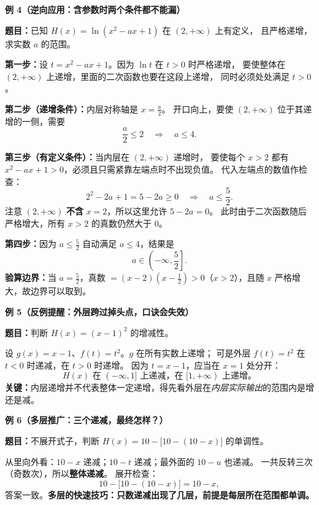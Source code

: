 \clearpage
\begin{examplebox}
\textbf{\textcolor{CExample}{例 4（逆向应用：含参数时两个条件都不能漏）}}



\textbf{题目：}已知 $H(x)=\ln(x^2-ax+1)$ 在 $(2,+\infty)$ 上有定义，
且严格递增，求实数 $a$ 的范围。

\textbf{第一步：}设 $t=x^2-ax+1$。因为 $\ln t$ 在 $t>0$ 时严格递增，
要使整体在 $(2,+\infty)$ 上递增，里面的二次函数也要在这段上递增，
同时必须处处满足 $t>0$。

\textbf{第二步（递增条件）：}内层对称轴是 $x=\frac a2$。
开口向上，要使 $(2,+\infty)$ 位于其递增的一侧，需要
\[
 \frac a2\le2\quad\Longrightarrow\quad a\le4.
\]

\textbf{第三步（有定义条件）：}当内层在 $(2,+\infty)$ 递增时，
要使每个 $x>2$ 都有 $x^2-ax+1>0$，必须且只需紧靠左端点时不出现负值。
代入左端点的数值作检查：
\[
 2^2-2a+1=5-2a\ge0
 \quad\Longrightarrow\quad a\le\frac52.
\]
注意 $(2,+\infty)$ \textbf{不含} $x=2$，所以这里允许 $5-2a=0$。
此时由于二次函数随后严格增大，所有 $x>2$ 的真数仍然大于 $0$。

\textbf{第四步：}因为 $a\le\frac52$ 自动满足 $a\le4$，结果是
\[
 \boxed{a\in\left(-\infty,\frac52\right].}
\]
\textbf{验算边界：}当 $a=\frac52$，真数
$=(x-2)\left(x-\frac12\right)>0$（$x>2$），且随 $x$ 严格增大，故边界可以取到。

\medskip
\end{examplebox}
\clearpage
\begin{examplebox}
\textbf{\textcolor{CExample}{例 5（反例提醒：外层跨过掉头点，口诀会失效）}}



\textbf{题目：}判断 $H(x)=(x-1)^2$ 的增减性。

设 $g(x)=x-1$、$f(t)=t^2$。$g$ 在所有实数上递增；
可是外层 $f(t)=t^2$ 在 $t<0$ 时递减，在 $t>0$ 时递增。
因为 $t=x-1$，应当在 $x=1$ 处分开：
\[
\boxed{H(x)\text{ 在 }(-\infty,1]\text{ 上递减，在 }[1,+\infty)\text{ 上递增。}}
\]
\textbf{关键：}内层递增并不代表整体一定递增，得先看外层在\emph{内层实际输出}的范围内是增还是减。

\medskip
\end{examplebox}
\clearpage
\begin{examplebox}
\textbf{\textcolor{CExample}{例 6（多层推广：三个递减，最终怎样？）}}



\textbf{题目：}不展开式子，判断 $H(x)=10-\bigl[10-(10-x)\bigr]$ 的单调性。

从里向外看：$10-x$ 递减；$10-t$ 递减；最外面的 $10-u$ 也递减。
一共反转三次（奇数次），所以\textbf{整体递减}。
展开检查：
\[
 10-\bigl[10-(10-x)\bigr]=10-x,
\]
答案一致。\textbf{多层的快速技巧：只数递减出现了几层，前提是每层所在范围都单调。}
\end{examplebox}
